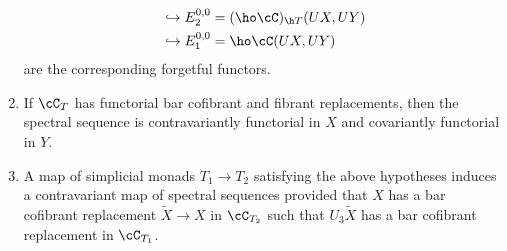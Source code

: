 \documentclass[leqno,oneside,english]{elsarticle}
\begin{document}
\begin{thmA}
\begin{enumerate}
\begin{align*}
	 &\hookrightarrow E_2^{0,0} = (\ho\cC)_{\h T}(UX, UY)\\
	 &\hookrightarrow E_1^{0,0} = \ho\cC (UX, UY)
       \end{align*}
       are the corresponding forgetful functors.
     \item \label{it:functoriality-X-Y}
       If $\cC_T$ has functorial bar cofibrant and fibrant
       replacements, then the spectral sequence is contravariantly functorial in
       $X$ and covariantly functorial in $Y$.
     \item \label{it:map-of-monads}
       A map of simplicial monads $T_1\rightarrow T_2$ satisfying the above
       hypotheses induces a contravariant map of spectral sequences provided that
       $X$ has a bar cofibrant replacement $\widetilde{X} \to X$ in
       $\cC_{T_2}$ such that $U_3 \widetilde{X}$ has a bar cofibrant
       replacement in $\cC_{T_1}$.
       \end{enumerate}
\end{thmA}
\end{document}
